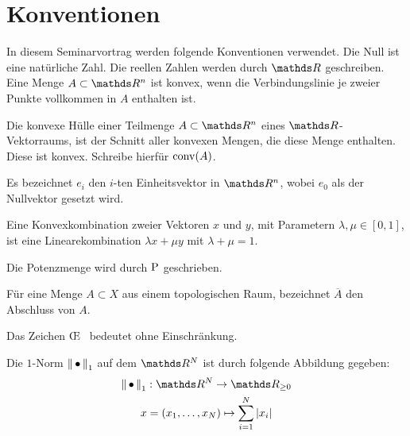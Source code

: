 
\section*{Konventionen}

In diesem Seminarvortrag werden folgende Konventionen verwendet. Die
Null ist eine natürliche Zahl. Die reellen Zahlen werden durch $\R$
geschreiben.  Eine Menge $A \subset \R^n$ ist konvex, wenn die
Verbindungslinie je zweier Punkte vollkommen in $A$ enthalten ist.

Die konvexe Hülle einer Teilmenge $A \subset \R^n$ eines
$\R$-Vektorraums, ist der Schnitt aller konvexen Mengen, die diese
Menge enthalten. Diese ist konvex. Schreibe hierfür $\operatorname{conv}(A)$.

Es bezeichnet $e_i$ den $i$-ten Einheitsvektor in $\R^n$, wobei $e_0$
als der Nullvektor gesetzt wird.

Eine Konvexkombination zweier Vektoren $x$ und $y$, mit Parametern
$\lambda,\mu \in [0,1]$, ist eine Linearekombination
$\lambda x + \mu y$ mit $\lambda + \mu = 1$.

Die Potenzmenge wird durch $\operatorname{P}$ geschrieben.

Für eine Menge $A \subset X$ aus einem topologischen Raum, bezeichnet
$\overline{A}$ den Abschluss von $A$.

Das Zeichen \OE~ bedeutet ohne Einschränkung.

Die $1$-Norm $\left\| \,\bullet\, \right\|_1$ auf dem $\R^N$ ist durch folgende Abbildung gegeben:
\begin{gather*}
  \nn_1 : \R^N \rightarrow \R_{\geq 0}\\
  x = (x_1,\ldots ,x_N) \mapsto \sp{1}{N} |x_i|
\end{gather*}


